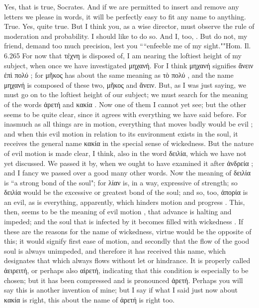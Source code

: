 {{{{{\hermogenesspeaks
Yes, that is true, Socrates.
\socratesspeaks
And if we are permitted to insert and remove any letters we please in words, it will be perfectly easy to fit any name to anything. 
\hermogenesspeaks
True.
\socratesspeaks
Yes, quite true. But I think you, as a wise director, must observe the rule of moderation and probability.
\hermogenesspeaks
I should like to do so.
\socratesspeaks
And I, too, \hermogenesspeaks.  But do not, my friend, demand too much precision, lest you ````enfeeble me of my sight.""Hom. Il. 6.265 For now that τέχνη  is disposed of, I am nearing the loftiest height of my subject, when once we have investigated μηχανή. For I think μηχανή signifies ἄνειν ἐπὶ πολύ ; for μῆκος  has about the same meaning as τὸ πολύ , and the name μηχανή is composed of these two, μῆκος and ἄνειν. But, as I was just saying, we must go on to the loftiest height of our subject; we must search for the meaning of the words ἀρετή  and κακία . Now one of them I cannot yet see;  but the other seems to be quite clear, since it agrees with everything we have said before. For inasmuch as all things are in motion, everything that moves badly  would be evil ; and when this evil motion in relation to its environment exists in the soul, it receives the general name κακία  in the special sense of wickedness. But the nature of evil motion  is made clear, I think, also in the word δειλία, which we have not yet discussed. We passed it by,  when we ought to have examined it after ἀνδρεία ; and I fancy we passed over a good many other words. Now the meaning of δειλία is ``a strong bond of the soul"; for λίαν  is, in a way, expressive of strength; so δειλία would be the excessive or greatest bond  of the soul; and so, too, ἀπορία  is an evil, as is everything, apparently, which hinders motion and progress . This, then, seems to be the meaning of evil motion , that advance is halting and impeded; and the soul that is infected by it becomes filled with wickedness . If these are the reasons for the name of wickedness, virtue  would be the opposite of this; it would signify first ease of motion,  and secondly that the flow of the good soul is always unimpeded, and therefore it has received this name, which designates that which always flows  without let or hindrance. It is properly called ἀειρειτή, or perhaps also αἱρετή, indicating that this condition is especially to be chosen; but it has been compressed and is pronounced ἀρετή. Perhaps you will say this is another invention of mine; but I say if what I said just now about κακία is right,  this about the name of ἀρετή is right too. 
}}}}}
